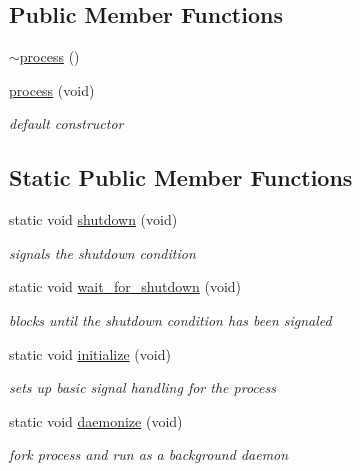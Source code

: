\subsection*{Public Member Functions}
\begin{DoxyCompactItemize}
\item 
\hyperlink{classpion_1_1process_a3a22ab2acbed153003375aba7c336b47}{$\sim$process} ()
\item 
\hyperlink{classpion_1_1process_a75bde31b3d1651f92705ae06eda36917}{process} (void)
\begin{DoxyCompactList}\small\item\em default constructor \end{DoxyCompactList}\end{DoxyCompactItemize}
\subsection*{Static Public Member Functions}
\begin{DoxyCompactItemize}
\item 
static void \hyperlink{classpion_1_1process_aed3145650f11fcea4e968efc55127aba}{shutdown} (void)
\begin{DoxyCompactList}\small\item\em signals the shutdown condition \end{DoxyCompactList}\item 
static void \hyperlink{classpion_1_1process_a0141a4c774af4e4e605230c277cfa4f7}{wait\-\_\-for\-\_\-shutdown} (void)
\begin{DoxyCompactList}\small\item\em blocks until the shutdown condition has been signaled \end{DoxyCompactList}\item 
static void \hyperlink{classpion_1_1process_af6bf25c64faa04c8dba9cb215201d50e}{initialize} (void)
\begin{DoxyCompactList}\small\item\em sets up basic signal handling for the process \end{DoxyCompactList}\item 
static void \hyperlink{classpion_1_1process_af944a4e1fc8b6e4c1d8b4d8be52d1a8b}{daemonize} (void)
\begin{DoxyCompactList}\small\item\em fork process and run as a background daemon \end{DoxyCompactList}\end{DoxyCompactItemize}
